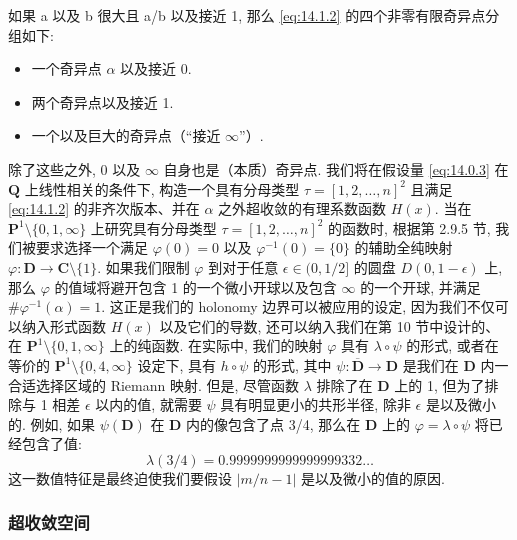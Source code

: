 \begin{remark}\label{rem:14.1.3}
如果 a 以及 b 很大且 a/b 以及接近 1, 
那么 \eqref{eq:14.1.2} 的四个非零有限奇异点分组如下:
\begin{itemize}
  \item[(1)] 一个奇异点 \(\alpha\) 以及接近 0.
  \item[(2)] 两个奇异点以及接近 1.
  \item[(3)] 一个以及巨大的奇异点（“接近 \(\infty\)”）.
\end{itemize}
除了这些之外, 0 以及 \(\infty\) 自身也是（本质）奇异点. 
我们将在假设量 \eqref{eq:14.0.3} 在 \(\mathbf{Q}\) 上线性相关的条件下, 
构造一个具有分母类型 \(\tau = [1,2,\dots,n]^2\) 
且满足 \eqref{eq:14.1.2} 的非齐次版本、并在 \(\alpha\) 之外超收敛的有理系数函数 \(H(x)\). 
当在 \(\mathbf{P}^1 \setminus \{0,1,\infty\}\) 上研究具有分母类型 \(\tau = [1,2,\dots,n]^2\) 
的函数时, 根据第 2.9.5 节, 我们被要求选择一个满足 \(\varphi(0)=0\) 以及 \(\varphi^{-1}(0)=\{0\}\) 
的辅助全纯映射 \(\varphi: \mathbf{D} \to \mathbf{C} \setminus \{1\}\). 
如果我们限制 \(\varphi\) 到对于任意 \(\epsilon \in (0,1/2]\) 的圆盘 \(D(0,1-\epsilon)\) 上, 
那么 \(\varphi\) 的值域将避开包含 1 的一个微小开球以及包含 \(\infty\) 的一个开球, 
并满足 \(\#\varphi^{-1}(\alpha)=1\). 
这正是我们的 holonomy 边界可以被应用的设定, 
因为我们不仅可以纳入形式函数 \(H(x)\) 以及它们的导数, 
还可以纳入我们在第 10 节中设计的、在 \(\mathbf{P}^1 \setminus \{0,1,\infty\}\) 上的纯函数. 
在实际中, 我们的映射 \(\varphi\) 具有 \(\lambda \circ \psi\) 的形式, 
或者在等价的 \(\mathbf{P}^1 \setminus \{0,4,\infty\}\) 设定下, 具有 \(h \circ \psi\) 的形式, 
其中 \(\psi : \overline{\mathbf{D}} \to \mathbf{D}\) 
是我们在 \(\mathbf{D}\) 内一合适选择区域的 Riemann 映射. 
但是, 尽管函数 \(\lambda\) 排除了在 \(\mathbf{D}\) 上的 1, 
但为了排除与 1 相差 \(\epsilon\) 以内的值, 
就需要 \(\psi\) 具有明显更小的共形半径, 
除非 \(\epsilon\) 是以及微小的. 
例如, 如果 \(\psi(\mathbf{D})\) 在 \(\mathbf{D}\) 内的像包含了点 3/4, 
那么在 \(\mathbf{D}\) 上的 \(\varphi = \lambda \circ \psi\) 
将已经包含了值:
\[ \lambda(3/4) = 0.9999999999999999332\dots \]
这一数值特征是最终迫使我们要假设 \(|m/n-1|\) 是以及微小的值的原因. \end{remark}

\subsubsection{超收敛空间}\label{sec:14.1.4}

